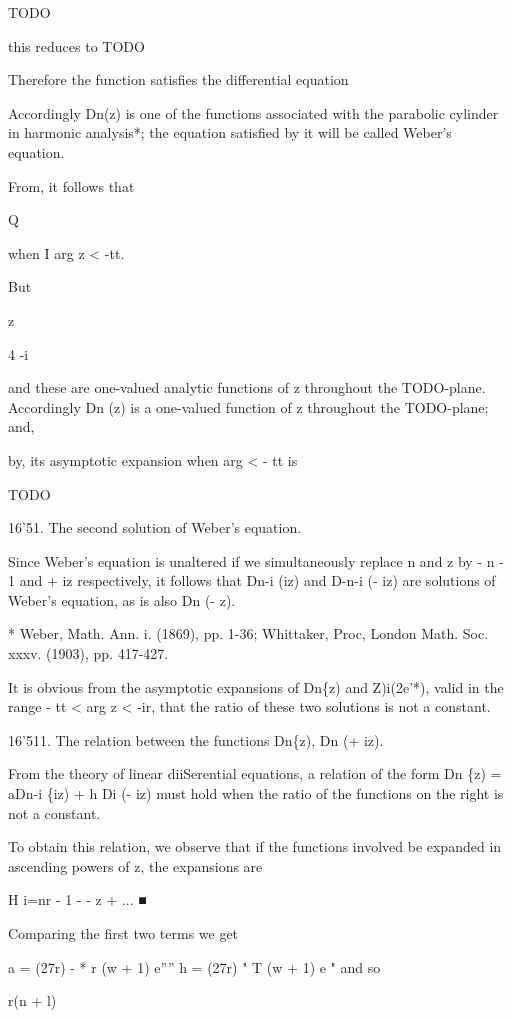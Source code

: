 TODO

this reduces to TODO

Therefore the function satisfies the differential equation

Accordingly Dn(z) is one of the functions associated with the
parabolic cylinder in harmonic analysis*; the equation satisfied by it
will be called Weber's equation.

From, it follows that

Q

when I arg z < -tt.

But

z

4 -i

and these are one-valued analytic functions of z throughout the
TODO-plane. Accordingly Dn (z) is a one-valued function of z
throughout the TODO-plane; and,

by, its asymptotic expansion when arg  < - tt is

TODO

16'51. The second solution of Weber's equation.

Since Weber's equation is unaltered if we simultaneously replace n and
z by - n - 1 and + iz respectively, it follows that Dn-i (iz) and
D-n-i (- iz) are solutions of Weber's equation, as is also Dn (- z).

* Weber, Math. Ann. i. (1869), pp. 1-36; Whittaker, Proc, London Math.
Soc. xxxv. (1903), pp. 417-427.

%
%

It is obvious from the asymptotic expansions of Dn\{z) and
Z)i(2e'*), valid in the range -  tt < arg z < -ir, that the
ratio of these two solutions is not a constant.

16'511. The relation between the functions Dn\{z), Dn (+ iz).

From the theory of linear diiSerential equations, a relation of the
form Dn \{z) = aDn-i \{iz) + h Di (- iz) must hold when the
ratio of the functions on the right is not a constant.

To obtain this relation, we observe that if the functions involved be
expanded in ascending powers of z, the expansions are

H i=nr - 1 -  - z + ... ■

Comparing the first two terms we get

a = (27r) - * r (w + 1) e'''' h = (27r) "  T (w + 1) e " and so

r(n + l)

